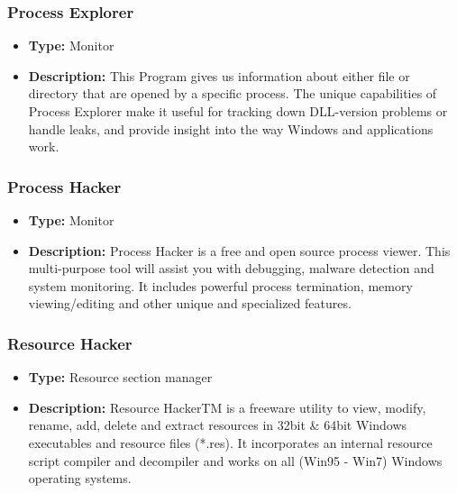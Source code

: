 \documentclass[]{beamer}
\begin{document}
		\begin{frame}
			\frametitle{Process Explorer}
				\begin{itemize}
					\item{\textbf{Type:} Monitor }
					\item{\textbf{Description:} This Program gives us information about either file or directory that are opened by a specific process. The unique capabilities of Process Explorer make it useful for tracking down DLL-version problems or handle leaks, and provide insight into the way Windows and applications work. }
				\end{itemize}
		\end{frame}
		\begin{frame}
			\frametitle{Process Hacker}
				\begin{itemize}
					\item{\textbf{Type:} Monitor}
					\item{\textbf{Description:} Process Hacker is a free and open source process viewer. This multi-purpose tool will assist you with debugging, malware detection and system monitoring. It includes powerful process termination, memory viewing/editing and other unique and specialized features.}
				\end{itemize}
		\end{frame}
		\begin{frame}
			\frametitle{Resource Hacker}
				\begin{itemize}
					\item{\textbf{Type:} Resource section manager}
					\item{\textbf{Description:} Resource HackerTM is a freeware utility to view, modify, rename, add, delete and extract resources in 32bit \& 64bit Windows executables and resource files (*.res). It incorporates an internal resource script compiler and decompiler and works on all (Win95 - Win7) Windows operating systems. }
				\end{itemize}
		\end{frame}
\end{document}
